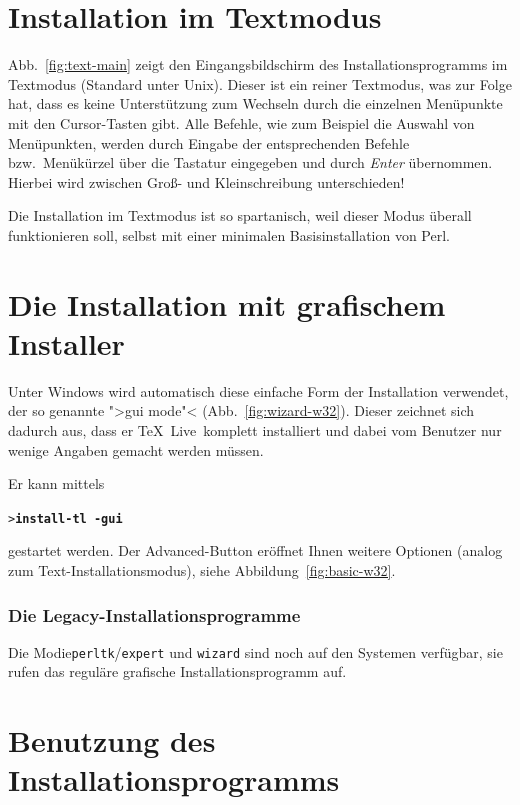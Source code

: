 \documentclass[12pt,ngerman,a4paper,fullparskip]{report}
\newcommand{\TL}{\TeX\ Live\xspace}
\newcommand{\Ucom}[1]{\textbf{\texttt{#1}}}
\begin{document}
\section{Installation im Textmodus}

Abb.~\ref{fig:text-main} zeigt den Eingangsbildschirm des Installationsprogramms im Textmodus (Standard unter Unix). Dieser ist ein reiner Textmodus, was zur Folge hat, dass es keine Unterstützung zum Wechseln durch die einzelnen Menüpunkte mit den Cursor-Tasten gibt. Alle Befehle, wie zum Beispiel die Auswahl von Menüpunkten, werden durch Eingabe der entsprechenden Befehle bzw.\ Menükürzel über die Tastatur eingegeben und durch \emph{Enter} übernommen. Hierbei wird zwischen Groß- und Kleinschreibung unterschieden!

Die Installation im Textmodus ist so spartanisch, weil dieser Modus überall funktionieren soll, selbst mit einer minimalen Basisinstallation von Perl.

\section{Die Installation mit grafischem Installer}

Unter Windows wird automatisch diese einfache Form der Installation verwendet,
der so genannte ">gui mode"< (Abb.~\ref{fig:wizard-w32}). Dieser zeichnet sich dadurch aus, dass er \TL\ komplett installiert und dabei vom Benutzer nur wenige Angaben gemacht werden müssen. 

Er kann mittels 

\begin{alltt}
> \Ucom{install-tl -gui}
\end{alltt}

gestartet werden.  Der Advanced-Button eröffnet Ihnen weitere Optionen (analog zum Text-Installationsmodus), siehe  Abbildung~\ref{fig:basic-w32}.

\subsubsection{Die Legacy-Installationsprogramme}

Die Modie\texttt{perltk}/\texttt{expert} und \texttt{wizard} sind noch auf den Systemen verfügbar, sie rufen das reguläre grafische Installationsprogramm auf.

\section{Benutzung des Installationsprogramms}\label{sec:runinstall}
\end{document}
